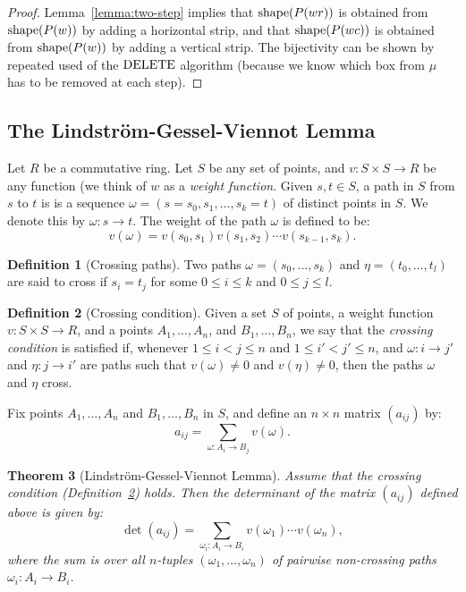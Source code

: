 \documentclass[11pt]{amsart}
\newtheorem{theorem}{Theorem}[subsection]
\theoremstyle{definition}
\newtheorem{definition}[theorem]{Definition}
\theoremstyle{example}
\newcommand{\del}{\textup{DELETE}}
\newcommand{\shape}{\textup{shape}}
\begin{document}
\begin{proof}
  Lemma~\ref{lemma:two-step} implies that $\shape(P(wr))$ is obtained from $\shape(P(w))$ by adding a horizontal strip, and that $\shape(P(wc))$ is obtained from \linebreak $\shape(P(w))$ by adding a vertical strip.
  The bijectivity can be shown by repeated used of the $\del$ algorithm (because we know which box from $\mu$ has to be removed at each step).
\end{proof}
\subsection{The Lindstr\"om-Gessel-Viennot Lemma}
\label{sec:lgv}
Let $R$ be a commutative ring.
Let $S$ be any set of points, and $v:S\times S\to R$ be any function (we think of $w$ as a \emph{weight function}.
Given $s, t\in S$, a path in $S$ from $s$ to $t$ is is a sequence $\omega=(s=s_0,s_1,\dotsc,s_k=t)$ of distinct points in $S$.
We denote this by $\omega:s\to t$.
The weight of the path $\omega$ is defined to be:
\begin{displaymath}
  v(\omega) = v(s_0,s_1)v(s_1,s_2)\dotsb v(s_{k-1}, s_k).
\end{displaymath}
\begin{definition}
  [Crossing paths]
  Two paths $\omega=(s_0,\dotsc, s_k)$ and $\eta=(t_0,\dotsc,t_l)$ are said to cross if $s_i= t_j$ for some $0\leq i \leq k$ and $0\leq j \leq l$.
\end{definition}
\begin{definition}
  [Crossing condition]
  \label{definition:crossing-condition}
  Given a set $S$ of points, a weight function $v:S\times S\to R$, and a points $A_1,\dotsc,A_n$, and $B_1,\dotsc, B_n$, we say that the \emph{crossing condition} is satisfied if, whenever $1\leq i<j\leq n$ and $1\leq i'<j'\leq n$, and $\omega:i \to j'$ and $\eta: j\to i'$ are paths such that $v(\omega)\neq 0$ and $v(\eta)\neq 0$, then the paths $\omega$ and $\eta$ cross.
\end{definition}
Fix points $A_1,\dotsc, A_n$ and $B_1,\dotsc, B_n$ in $S$, and define an $n\times n$ matrix $(a_{ij})$ by:
\begin{displaymath}
  a_{ij} = \sum_{\omega:A_i\to B_j} v(\omega).
\end{displaymath}
\begin{theorem}
  [Lindstr\"om-Gessel-Viennot Lemma]
  \label{lemma:lgv}
  Assume that the crossing condition (Definition~\ref{definition:crossing-condition}) holds.
  Then the determinant of the matrix $(a_{ij})$ defined above is given by:
  \begin{equation}
    \label{eq:lgv}
    \det(a_{ij}) = \sum_{\omega_i:A_i\to B_i} v(\omega_1)\dotsb v(\omega_n),
  \end{equation}
  where the sum is over all $n$-tuples $(\omega_1,\dotsc, \omega_n)$ of pairwise non-crossing paths $\omega_i:A_i\to B_i$.
\end{theorem}
\end{document}

